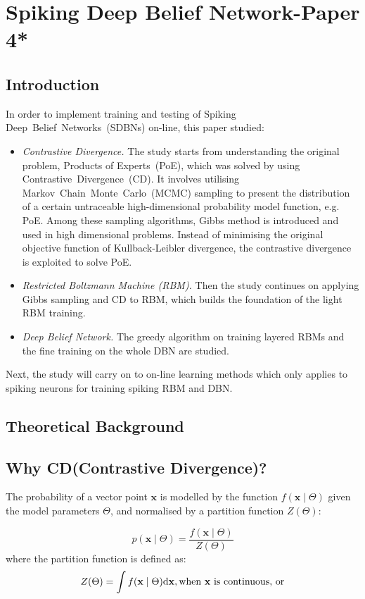 \chapter{Spiking Deep Belief Network-Paper 4*}
\label{cha:sdbn}

\section{Introduction}
	In order to implement training and testing of Spiking Deep~Belief~Networks~(SDBNs) on-line, this paper studied:
	\begin{itemize}
		\item \textit{Contrastive Divergence.}
		The study starts from understanding the original problem, Products of Experts~(PoE), which was solved by using Contrastive~Divergence~(CD).
		It involves utilising Markov~Chain~Monte~Carlo~(MCMC) sampling to present the distribution of a certain untraceable high-dimensional probability model function, e.g. PoE.
		Among these sampling algorithms, Gibbs method is introduced and used in high dimensional problems.
		Instead of minimising the original objective function of Kullback-Leibler divergence, the contrastive divergence is exploited to solve PoE.
		\item \textit{Restricted Boltzmann Machine (RBM). }
		Then the study continues on applying Gibbs sampling and CD to RBM, which builds the foundation of the light RBM training.
		\item \textit{Deep Belief Network.} 
		The greedy algorithm on training layered RBMs and the fine training on the whole DBN are studied.
	\end{itemize}
	Next, the study will carry on to on-line learning methods which only applies to spiking neurons for training spiking RBM and DBN.
\section{Theoretical Background}
\section{Why CD(Contrastive Divergence)?\cite{hinton2002training,woodfordnotes}}
	The probability of a vector point $ \mathbf{x} $ is modelled by the function $f(\mathbf{x} \mid \Theta )$ given the model parameters $ \Theta $, and normalised by a partition function $Z( \Theta)$:
	
	\begin{equation}
	p(\mathbf{x} \mid \Theta ) = \dfrac{f(\mathbf{x} \mid \Theta )}{Z( \Theta)}
	\end{equation}
	where the partition function is defined as:
	\begin{equation}
	\label{equ:z_int}
	Z( \Theta) = \int f(\mathbf{x} \mid \Theta )\mathrm{d}\mathbf{x}, \text{when  $ \mathbf{x} $ is continuous, or}
	\end{equation}
	
